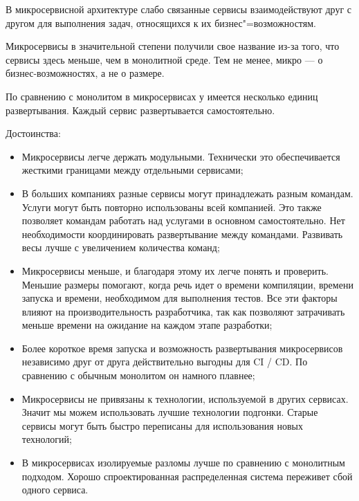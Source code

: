 В микросервисной архитектуре слабо связанные сервисы взаимодействуют друг с другом для выполнения задач, относящихся к их бизнес"=возможностям.

Микросервисы в значительной степени получили свое название из-за того, что сервисы здесь меньше, чем в монолитной среде. Тем не менее, микро — о бизнес-возможностях, а не о размере.

По сравнению с монолитом в микросервисах у имеется несколько единиц развертывания. Каждый сервис развертывается самостоятельно.

Достоинства:
\begin{itemize}
    \item Микросервисы легче держать модульными. Технически это обеспечивается жесткими границами между отдельными сервисами;
    \item В больших компаниях разные сервисы могут принадлежать разным командам.
    Услуги могут быть повторно использованы всей компанией.
    Это также позволяет командам работать над услугами в основном самостоятельно.
    Нет необходимости координировать развертывание между командами.
    Развивать весы лучше с увеличением количества команд;
    \item Микросервисы меньше, и благодаря этому их легче понять и проверить.
    Меньшие размеры помогают, когда речь идет о времени компиляции, времени запуска и времени, необходимом для выполнения тестов.
    Все эти факторы влияют на производительность разработчика, так как позволяют затрачивать меньше времени на ожидание на каждом этапе разработки;
    \item Более короткое время запуска и возможность развертывания микросервисов независимо друг от друга действительно выгодны для CI / CD.
    По сравнению с обычным монолитом он намного плавнее;
    \item Микросервисы не привязаны к технологии, используемой в других сервисах.
    Значит мы можем использовать лучшие технологии подгонки.
    Старые сервисы могут быть быстро переписаны для использования новых технологий;
    \item В микросервисах изолируемые разломы лучше по сравнению с монолитным подходом.
    Хорошо спроектированная распределенная система переживет сбой одного сервиса.
\end{itemize}


